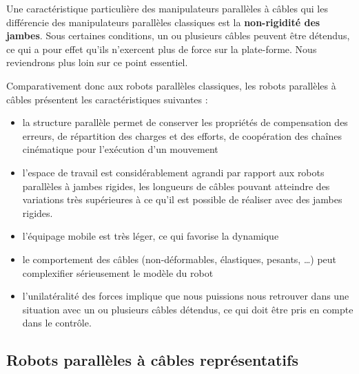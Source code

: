 Une caractéristique particulière des manipulateurs parallèles à câbles qui les 
différencie des manipulateurs parallèles classiques est la {\bf non-rigidité 
des 
jam\-bes}. Sous certaines conditions, un ou plusieurs câbles peuvent être 
détendus, ce qui a pour effet qu'ils n'exercent plus de force sur la 
plate-forme. Nous reviendrons plus loin sur ce point essentiel.

Comparativement donc aux robots parallèles classiques, les robots parallèles à 
câbles présentent les caractéristiques suivantes :
\begin{itemize}
 \item la structure parallèle permet de conserver les propriétés de 
compensation des erreurs, de répartition des charges et des efforts, de coopération des 
chaînes cinématique pour l'exécution d'un mouvement
 \item l'espace de travail est considérablement agrandi par rapport aux robots 
parallèles à jambes rigides, les longueurs de câbles pouvant atteindre des variations très supérieures à ce qu'il est possible de réaliser avec des jambes rigides. 
 \item l'équipage mobile est très léger, ce qui favorise la dynamique
 \item le comportement des câbles (non-déformables, élastiques, pesants, \dots) 
peut complexifier s\'erieusement le modèle du robot
 \item l'unilatéralité des forces implique que nous puissions nous retrouver 
dans une situation avec un ou plusieurs câbles détendus, ce qui doit être pris 
en compte dans le contrôle.
\end{itemize}


\subsection{Robots parall\`eles à c\^ables repr\'esentatifs} \label{chap0-1-0}

